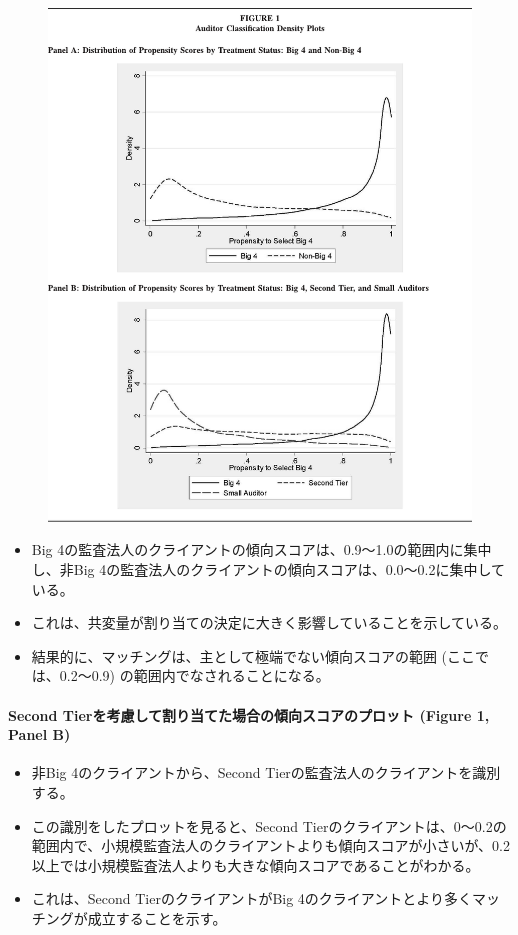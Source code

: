 \begin{figure}
 \centering
 \includegraphics[width=16cm]{../fig/fig01.pdf}
\end{figure}

\begin{itemize}
 \item Big 4の監査法人のクライアントの傾向スコアは、0.9〜1.0の範囲内に集中し、非Big 4の監査法人のクライアントの傾向スコアは、0.0〜0.2に集中している。
 \item これは、共変量が割り当ての決定に大きく影響していることを示している。
 \item 結果的に、マッチングは、主として極端でない傾向スコアの範囲 (ここでは、0.2〜0.9) の範囲内でなされることになる。
\end{itemize}

\paragraph{Second Tierを考慮して割り当てた場合の傾向スコアのプロット (Figure 1, Panel B) }

\begin{itemize}
 \item 非Big 4のクライアントから、Second Tierの監査法人のクライアントを識別する。
 \item この識別をしたプロットを見ると、Second Tierのクライアントは、0〜0.2の範囲内で、小規模監査法人のクライアントよりも傾向スコアが小さいが、0.2以上では小規模監査法人よりも大きな傾向スコアであることがわかる。
 \item これは、Second TierのクライアントがBig 4のクライアントとより多くマッチングが成立することを示す。
\end{itemize}


